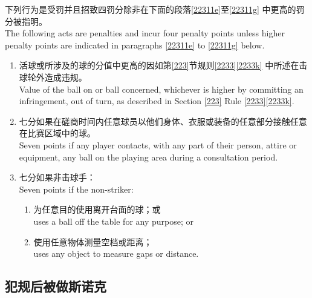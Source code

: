 \noindent 下列行为是受罚并且招致四罚分除非在下面的段落\ref{22311e}至\ref{22311g} 中更高的罚分被指明。\\
The following acts are penalties and incur four penalty points unless higher penalty points are indicated in paragraphs \ref{22311e} to \ref{22311g} below.
\begin{enumerate}[label=(\alph*),start=5]
    \item \label{22311e}活球或所涉及的球的分值中更高的因如第\ref{223}节规则\ref{2233}\ref{2233k} 中所述在击球轮外造成违规。\\
    Value of the ball on or ball concerned, whichever is higher by committing an infringement, out of turn, as described in Section \ref{223} Rule \ref{2233}\ref{2233k}.
    \item 七分如果在磋商时间内任意球员以他们身体、衣服或装备的任意部分接触任意在比赛区域中的球。\\
    Seven points if any player contacts, with any part of their person, attire or equipment, any ball on the playing area during a consultation period.
    \item \label{22311g}七分如果非击球手：\\
    Seven points if the non-striker:
    \begin{enumerate}[label=(\roman*)]
        \item 为任意目的使用离开台面的球；或\\
        uses a ball off the table for any purpose; or
        \item 使用任意物体测量空档或距离；\\
        uses any object to measure gaps or distance.
    \end{enumerate}
\end{enumerate}

\subsection{犯规后被做斯诺克}\label{22312}


